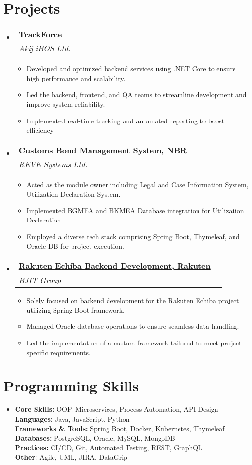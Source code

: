\documentclass[a4paper,11pt]{article}
\makeatletter
\newcommand{\resumeItem}[1]{\item[$\bullet$] \small{#1 \vspace{-2pt}}}
\newcommand{\resumeSubHeadingListStart}{\begin{itemize}[leftmargin=0pt, label={}]}
\newcommand{\resumeSubHeadingListEnd}{\end{itemize}}
\newcommand{\resumeItemListStart}{\begin{itemize}}
\newcommand{\resumeItemListEnd}{\end{itemize}\vspace{-5pt}}
\newcommand{\resumeSubheading}[5]{
    \vspace{-1pt}\item
    \begin{tabular*}{1\textwidth}{l@{\extracolsep{\fill}}r}
    \textbf{\href{#4}{#1}} & #2 \\
    \textit{\small#3} & \textit{\small #5} \\
    \end{tabular*}\vspace{-5pt}
}
\makeatother
\begin{document}
    \section{Projects}
    \resumeSubHeadingListStart
    \resumeSubheading
        {TrackForce}{}
        {Akij iBOS Ltd.}{https://app.trackforce.io/}{}
    \resumeItemListStart
        \resumeItem{Developed and optimized backend services using .NET Core to ensure high performance and scalability.}
        \resumeItem{Led the backend, frontend, and QA teams to streamline development and improve system reliability.}
        \resumeItem{Implemented real-time tracking and automated reporting to boost efficiency.}
    \resumeItemListEnd
    \resumeSubheading
        {Customs Bond Management System, NBR}{}
        {REVE Systems Ltd.}{https://cusbond.gov.bd/}{}
    \resumeItemListStart
        \resumeItem{Acted as the module owner including Legal and Case Information System, Utilization Declaration System.}
        \resumeItem{Implemented BGMEA and BKMEA Database integration for Utilization Declaration.}
        \resumeItem{Employed a diverse tech stack comprising Spring Boot, Thymeleaf, and Oracle DB for project execution.}
    \resumeItemListEnd
    \resumeSubheading
        {Rakuten Echiba Backend Development, Rakuten}{}
        {BJIT Group}{https://www.rakuten.co.jp/}{}
    \resumeItemListStart
        \resumeItem{Solely focused on backend development for the Rakuten Echiba project utilizing Spring Boot framework.}
        \resumeItem{Managed Oracle database operations to ensure seamless data handling.}
        \resumeItem{Led the implementation of a custom framework tailored to meet project-specific requirements.}
    \resumeItemListEnd
    \resumeSubHeadingListEnd

    \section{Programming Skills}
    \resumeSubHeadingListStart
    \item{
        \textbf{Core Skills:} OOP, Microservices, Process Automation, API Design \\
        \textbf{Languages:} Java, JavaScript, Python \\
        \textbf{Frameworks \& Tools:} Spring Boot, Docker, Kubernetes, Thymeleaf \\
        \textbf{Databases:} PostgreSQL, Oracle, MySQL, MongoDB \\
        \textbf{Practices:} CI/CD, Git, Automated Testing, REST, GraphQL \\
        \textbf{Other:} Agile, UML, JIRA, DataGrip
    }
    \resumeSubHeadingListEnd
\end{document}
